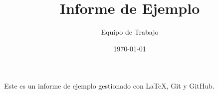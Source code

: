 \documentclass{article}
\title{Informe de Ejemplo}
\author{Equipo de Trabajo}
\date{\today}
\begin{document}
\maketitle

Este es un informe de ejemplo gestionado con \LaTeX{}, Git y GitHub.



\end{document}
